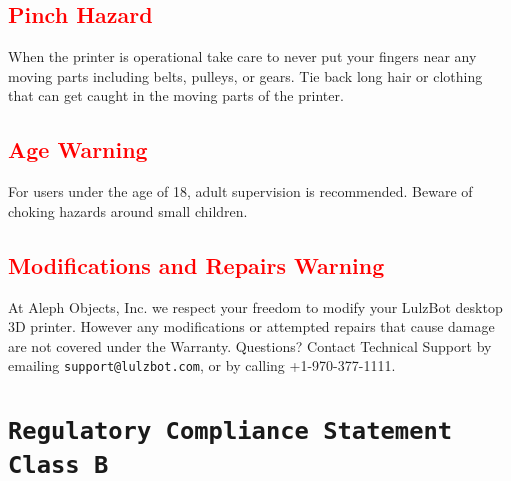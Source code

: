 \subsection{\textcolor{red}{Pinch Hazard}}

When the printer is operational take care to never put your fingers near any moving parts including belts, pulleys, or gears. Tie back long hair or clothing that can get caught in the moving parts of the printer.

\subsection{\textcolor{red}{Age Warning}}

For users under the age of 18, adult supervision is recommended. Beware of choking hazards around small children.

\subsection{\textcolor{red}{Modifications and Repairs Warning}}

At Aleph Objects, Inc.\textsuperscript{\miniscule{\textregistered}} we respect your freedom to modify your LulzBot\textsuperscript{\miniscule{\textregistered}} desktop 3D printer. However any modifications or attempted repairs that cause damage are not covered under the Warranty. Questions? Contact Technical Support by emailing \texttt{support@lulzbot.com}, or by calling +1-970-377-1111.


\section{\texttt{Regulatory Compliance Statement Class B}} 
